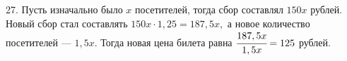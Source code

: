 27. Пусть изначально было $x$ посетителей, тогда сбор составлял $150x$ рублей. Новый сбор стал составлять $150x\cdot1,25=187,5x,$ а новое количество посетителей --- $1,5x.$ Тогда новая цена билета равна $\cfrac{187,5x}{1,5x}=125$ рублей.\\
